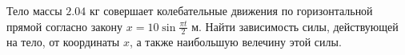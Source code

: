 Тело массы $2.04$ кг совершает колебательные движения
по горизонтальной прямой согласно закону
$x = 10\sin{\frac{\pi t}{2}}$ м.
Найти зависимость силы, действующей на тело, от координаты $x$,
а также наибольшую велечину этой силы.
